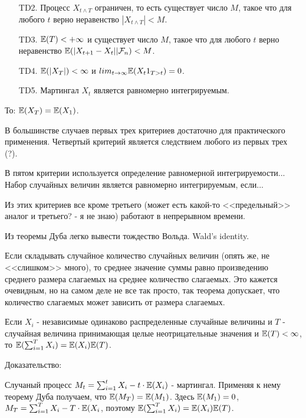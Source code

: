{\begin{itemize}
\item [TD2.] Процесс $X_{t\wedge T}$ ограничен, то есть существует число $M$, такое что для любого $t$ верно неравенство $|X_{t\wedge T}|<M$.

\item [TD3.] $\mathbb{E}(T)<+\infty$ и существует число $M$, такое что для любого $t$ верно неравенство $\mathbb{E}(|X_{t+1}-X_{t}||\mathcal{F}_{n})<M$.

\item [TD4.] $\mathbb{E}(|X_{T}|)<\infty$ и $lim_{t\rightarrow\infty}\mathbb{E}(X_{t}1_{T>t})=0$.

\item [TD5.] Мартингал $X_{t}$ является равномерно интегрируемым.

\end{itemize}


То: $\mathbb{E}(X_{T})=\mathbb{E}(X_{1})$.

В большинстве случаев первых трех критериев достаточно для практического применения.
Четвертый критерий является следствием любого из первых трех (?).

В пятом критерии используется определение равномерной интегрируемости...
Набор случайных величин является равномерно интегрируемым, если...


Из этих критериев все кроме третьего (может есть какой-то <<предельный>> аналог и третьего? - я не знаю) работают в непрерывном времени.

Из теоремы Дуба легко вывести тождество Вольда. Wald's identity.

Если складывать случайное количество случайных величин (опять же, не <<слишком>> много), то среднее значение суммы равно произведению среднего размера слагаемых на среднее количество слагаемых. Это кажется очевидным, но на самом деле не все так просто, так теорема допускает, что количество слагаемых может зависить от размера слагаемых.

Если $X_{i}$ - независимые одинаково распределенные случайные величины и $T$ - случайная величина принимающая целые неотрицательные значения и $\mathbb{E}(T)<\infty$, то $\mathbb{E}(\sum_{i=1}^{T}X_{i})=\mathbb{E}(X_{i})\mathbb{E}(T)$.

Доказательство:

Случаный процесс $M_{t}=\sum_{i=1}^{t}X_{i}-t\cdot \mathbb{E}(X_{i})$ - мартингал. Применяя к нему теорему Дуба получаем, что $\mathbb{E}(M_{T})=\mathbb{E}(M_{1})$. Здесь $\mathbb{E}(M_{1})=0$, $M_{T}=\sum_{i=1}^{T}X_{i}-T\cdot \mathbb{E}(X_{i}$, поэтому $\mathbb{E}(\sum_{i=1}^{T}X_{i})=\mathbb{E}(X_{i})\mathbb{E}(T)$.





}
